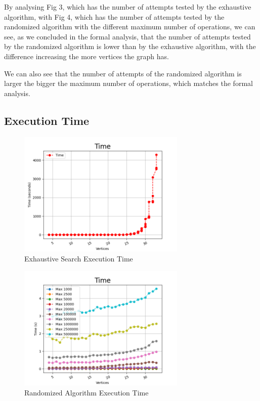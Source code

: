 \documentclass[]{revdetua}
\begin{document}
By analysing Fig 3, which has the number of attempts tested by the exhaustive algorithm, with Fig 4, which has the number of attempts tested by the randomized algorithm with the different maximum number of operations, we can see, as we concluded in the formal analysis, that the number of attempts tested by the randomized algorithm is lower than by the exhaustive algorithm, with the difference increasing the more vertices the graph has.

We can also see that the number of attempts of the randomized algorithm is larger the bigger the maximum number of operations, which matches the formal analysis.

\subsection{Execution Time}

\begin{figure}[h]
    \centering
    \includegraphics[width=8cm]{time_exhaustive.png}
    \caption{Exhaustive Search Execution Time}
\end{figure}

\begin{figure}[h]
    \centering
    \includegraphics[width=8cm]{time_randomized.png}
    \caption{Randomized Algorithm Execution Time}
\end{figure}
\end{document}

